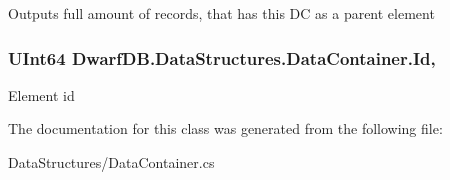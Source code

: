 Outputs full amount of records, that has this D\+C as a parent element 

\hypertarget{class_dwarf_d_b_1_1_data_structures_1_1_data_container_a3e5849e957860912c9050dbd84818dfd}{
\subsubsection[{Id}]{\setlength{\rightskip}{0pt plus 5cm}U\+Int64 Dwarf\+D\+B.\+Data\+Structures.\+Data\+Container.\+Id\hspace{0.3cm}{\ttfamily [get]}, {\ttfamily [set]}}}\label{class_dwarf_d_b_1_1_data_structures_1_1_data_container_a3e5849e957860912c9050dbd84818dfd}


Element id 



The documentation for this class was generated from the following file\+:\begin{DoxyCompactItemize}
\item 
Data\+Structures/Data\+Container.\+cs\end{DoxyCompactItemize}
